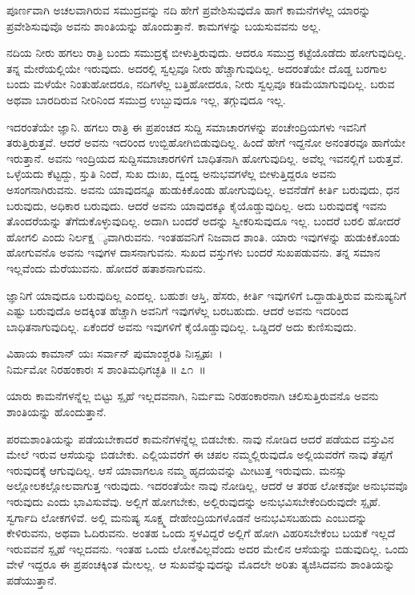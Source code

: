 \begin{artha}
ಪೂರ್ಣವಾಗಿ ಅಚಲವಾಗಿರುವ ಸಮುದ್ರವನ್ನು ನದಿ ಹೇಗೆ ಪ್ರವೇಶಿಸುವುದೊ ಹಾಗೆ ಕಾಮನೆಗಳೆಲ್ಲ ಯಾರನ್ನು ಪ್ರವೇಶಿಸುವುವೊ ಅವನು ಶಾಂತಿಯನ್ನು ಹೊಂದುತ್ತಾನೆ. ಕಾಮಗಳನ್ನು ಬಯಸುವವನು ಅಲ್ಲ.
\end{artha}

ನದಿಯ ನೀರು ಹಗಲು ರಾತ್ರಿ ಬಂದು ಸಮುದ್ರಕ್ಕೆ ಬೀಳುತ್ತಿರುವುದು. ಆದರೂ ಸಮುದ್ರ ಕಟ್ಟೆಯೊಡೆದು ಹೋಗುವುದಿಲ್ಲ. ತನ್ನ ಮೇರೆಯಲ್ಲಿಯೇ ಇರುವುದು. ಅದರಲ್ಲಿ ಸ್ವಲ್ಪವೂ ನೀರು ಹೆಚ್ಚಾಗುವುದಿಲ್ಲ. ಅದರಂತೆಯೇ ದೊಡ್ಡ ಬರಗಾಲ ಬಂದು ಮಳೆಯೇ ನಿಂತುಹೋದರೂ, ನದಿಗಳೆಲ್ಲ ಬತ್ತಿಹೋದರೂ, ನೀರು ಸ್ವಲ್ಪವೂ ಕಡಿಮೆಯಾಗುವುದಿಲ್ಲ. ಬರುವ ಅಥವಾ ಬಾರದಿರುವ ನೀರಿನಿಂದ ಸಮುದ್ರ ಉಬ್ಬುವುದೂ ಇಲ್ಲ, ತಗ್ಗುವುದೂ ಇಲ್ಲ.

ಇದರಂತೆಯೇ ಜ್ಞಾನಿ. ಹಗಲು ರಾತ್ರಿ ಈ ಪ್ರಪಂಚದ ಸುದ್ದಿ ಸಮಾಚಾರಗಳನ್ನು ಪಂಚೇಂದ್ರಿಯ\-ಗಳು ಇವನಿಗೆ ತರುತ್ತಿರುತ್ತವೆ. ಆದರೆ ಅವನು ಇದರಿಂದ ಉಬ್ಬಿಹೋಗಿಬಿಡುವುದಿಲ್ಲ. ಹಿಂದೆ ಹೇಗೆ ಇದ್ದನೋ ಅನಂತರವೂ ಹಾಗೆಯೇ ಇರುತ್ತಾನೆ. ಅವನು ಇಂದ್ರಿಯದ ಸುದ್ದಿಸಮಾಚಾರಗಳಿಗೆ ಬಾಧಿತನಾಗಿ ಹೋಗುವುದಿಲ್ಲ. ಅವೆಲ್ಲ ಇವನಲ್ಲಿಗೆ ಬರುತ್ತವೆ. ಒಳ್ಳೆಯದು ಕೆಟ್ಟದ್ದು, ಸ್ತುತಿ ನಿಂದೆ, ಸುಖ ದುಃಖ, ದ್ವಂದ್ವ ಅನುಭವಗಳೆಲ್ಲ ಬೀಳುತ್ತಿದ್ದರೂ ಅವನು ಅಸಂಗನಾಗಿರುವನು. ಅವನು ಯಾವುದನ್ನೂ ಹುಡುಕಿಕೊಂಡು ಹೋಗುವುದಿಲ್ಲ. ಅವನೆಡೆಗೆ ಕೀರ್ತಿ ಬರುವುದು, ಧನ ಬರುವುದು, ಅಧಿಕಾರ ಬರುವುದು. ಆದರೆ ಅವನು ಯಾವುದಕ್ಕೂ ಕೈಯೊಡ್ಡುವುದಿಲ್ಲ. ಅದು ಬರುವುದಕ್ಕೆ ಇವನು ತೊಂದರೆಯನ್ನು ತೆಗೆದುಕೊಳ್ಳುವುದಿಲ್ಲ. ಅದಾಗಿ ಬಂದರೆ ಅದನ್ನು ಸ್ವೀಕರಿಸುವುದೂ ಇಲ್ಲ. ಬಂದರೆ ಬರಲಿ ಹೋದರೆ ಹೋಗಲಿ ಎಂದು ನಿರ್ಲಕ್ಷ ್ಯವಾಗಿರುವನು. ಇಂತಹವನಿಗೆ ನಿಜವಾದ ಶಾಂತಿ. ಯಾರು ಇವುಗಳನ್ನು ಹುಡುಕಿಕೊಂಡು ಹೋಗುವನೊ ಅವನು ಇವುಗಳ ದಾಸನಾಗುವನು. ಸುಖದ ವಸ್ತುಗಳು ಬಂದರೆ ಸುಖಪಡುವನು. ತನ್ನ ಸಮಾನ ಇಲ್ಲವೆಂದು ಮೆರೆಯುವನು. ಹೋದರೆ ಹತಾಶನಾಗುವನು.

ಜ್ಞಾನಿಗೆ ಯಾವುದೂ ಬರುವುದಿಲ್ಲ ಎಂದಲ್ಲ. ಬಹುಶಃ ಆಸ್ತಿ, ಹೆಸರು, ಕೀರ್ತಿ ಇವುಗಳಿಗೆ ಒದ್ದಾಡುತ್ತಿರುವ ಮನುಷ್ಯನಿಗೆ ಎಷ್ಟು ಬರುವುದೊ ಅದಕ್ಕಿಂತ ಹೆಚ್ಚಾಗಿ ಅವನಿಗೆ ಇವುಗಳೆಲ್ಲ ಬರಬಹುದು. ಆದರೆ ಅವನು ಇದರಿಂದ ಬಾಧಿತನಾಗುವುದಿಲ್ಲ. ಏಕೆಂದರೆ ಅವನು ಇವುಗಳಿಗೆ ಕೈಯೊಡ್ಡುವುದಿಲ್ಲ. ಒಡ್ಡಿದರೆ ಅದು ಕುಣಿಸುವುದು.

\vskip -2pt

\begin{shloka}
ವಿಹಾಯ ಕಾಮಾನ್ ಯಃ ಸರ್ವಾನ್ ಪುಮಾಂಶ್ಚರತಿ ನಿಃಸ್ಪೃಹಃ~।\\ನಿರ್ಮಮೋ ನಿರಹಂಕಾರಃ ಸ ಶಾಂತಿಮಧಿಗಚ್ಛತಿ \hfill॥ ೭೧~॥
\end{shloka}

\vskip -2pt

\begin{artha}
ಯಾರು ಕಾಮನೆಗಳನ್ನೆಲ್ಲ ಬಿಟ್ಟು ಸ್ಪೃಹೆ ಇಲ್ಲದವನಾಗಿ, ನಿರ್ಮಮ ನಿರಹಂಕಾರನಾಗಿ ಚಲಿಸು\-ತ್ತಿರುವನೊ ಅವನು ಶಾಂತಿಯನ್ನು ಹೊಂದುತ್ತಾನೆ.
\end{artha}

\vskip -2pt

ಪರಮಶಾಂತಿಯನ್ನು ಪಡೆಯಬೇಕಾದರೆ ಕಾಮನೆಗಳನ್ನೆಲ್ಲ ಬಿಡಬೇಕು. ನಾವು ನೋಡಿದ ಆದರೆ ಪಡೆಯದ ವಸ್ತುವಿನ ಮೇಲೆ ಇರುವ ಆಸೆಯನ್ನು ಬಿಡಬೇಕು. ಎಲ್ಲಿಯವರೆಗೆ ಈ ಚಪಲ ನಮ್ಮಲ್ಲಿರುವುದೊ ಅಲ್ಲಿಯವರೆಗೆ ನಾವು ತೆಪ್ಪಗೆ ಇರುವುದಕ್ಕೆ ಆಗುವುದಿಲ್ಲ. ಆಸೆ ಯಾವಾಗಲೂ ನಮ್ಮ ಹೃದಯವನ್ನು ಮೀಟುತ್ತ ಇರುವುದು. ಮನಸ್ಸು ಅಲ್ಲೋಲಕಲ್ಲೋಲವಾಗುತ್ತ ಇರುವುದು. ಇದರಂತೆಯೇ ನಾವು ನೋಡಿಲ್ಲ, ಆದರೆ ಆ ತರಹ ಲೋಕವೋ ಅನುಭವವೊ ಇರುವುದು ಎಂದು ಭಾವಿಸುವೆವು. ಅಲ್ಲಿಗೆ ಹೋಗಬೇಕು, ಅಲ್ಲಿರುವುದನ್ನು ಅನುಭವಿಸಬೇಕೆಂದಿರುವುದೇ ಸ್ಪೃಹೆ. ಸ್ವರ್ಗಾದಿ ಲೋಕಗಳಿವೆ. ಅಲ್ಲಿ ಮನುಷ್ಯ ಸೂಕ್ಷ್ಮ ದೇಹೇಂದ್ರಿಯಗಳೊಡನೆ ಅನುಭವಿಸಬಹುದು ಎಂಬುದನ್ನು ಕೇಳಿರುವನು, ಅಥವಾ ಓದಿರುವನು. ಅಂತಹ ಒಂದು ಸ್ಥಳವಿದ್ದರೆ ಅಲ್ಲಿಗೆ ಹೋಗಿ ವಿಹರಿಸಬೇಕೆಂಬ ಬಯಕೆ ಇಲ್ಲದೆ ಇರುವವನೆ ಸ್ಪೃಹೆ ಇಲ್ಲದವನು. ಇಂತಹ ಒಂದು ಲೋಕವಿಲ್ಲವೆಂದು ಅದರ ಮೇಲಿನ ಆಸೆಯನ್ನು ಬಿಡುವುದಿಲ್ಲ. ಒಂದು ವೇಳೆ ಇದ್ದರೂ ಈ ಪ್ರಪಂಚಕ್ಕಿಂತ ಮೇಲಲ್ಲ. ಆ ಸುಖವೆನ್ನುವುದನ್ನು ಮೊದಲೇ ಅರಿತು ತ್ಯಜಿಸಿದವನು ಶಾಂತಿಯನ್ನು ಪಡೆಯುತ್ತಾನೆ.

